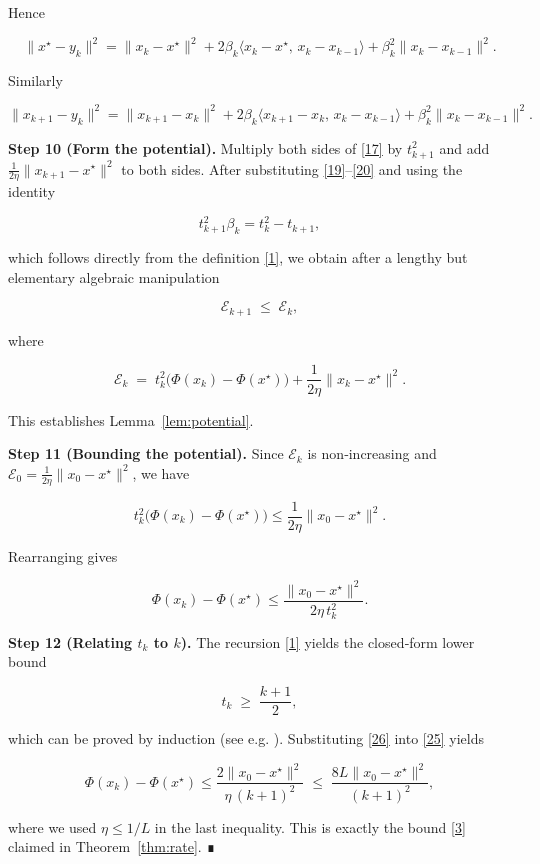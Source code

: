 \documentclass{article}
\begin{document}
Hence  

\[
\|x^\star-y_k\|^{2}
= \|x_k-x^\star\|^{2}+2\beta_k\langle x_k-x^\star,\,x_k-x_{k-1}\rangle
+\beta_k^{2}\|x_k-x_{k-1}\|^{2}.
\tag{19}
\]

Similarly  

\[
\|x_{k+1}-y_k\|^{2}
= \|x_{k+1}-x_k\|^{2}+2\beta_k\langle x_{k+1}-x_k,\,x_k-x_{k-1}\rangle
+\beta_k^{2}\|x_k-x_{k-1}\|^{2}.
\tag{20}
\]

\noindent\textbf{Step 10 (Form the potential).} Multiply both sides of \eqref{17} by $t_{k+1}^{2}$ and add $\frac{1}{2\eta}\|x_{k+1}-x^\star\|^{2}$ to both sides. After substituting \eqref{19}–\eqref{20} and using the identity  

\[
t_{k+1}^{2}\beta_k = t_k^{2}-t_{k+1},
\tag{21}
\]

which follows directly from the definition \eqref{1}, we obtain after a lengthy but elementary algebraic manipulation

\[
\mathcal{E}_{k+1}\;\le\;\mathcal{E}_{k},
\tag{22}
\]

where  

\[
\mathcal{E}_{k}\;=\;t_{k}^{2}\bigl(\Phi(x_{k})-\Phi(x^\star)\bigr)
+\frac{1}{2\eta}\|x_{k}-x^\star\|^{2}.
\tag{23}
\]

This establishes Lemma~\ref{lem:potential}.

\noindent\textbf{Step 11 (Bounding the potential).} Since $\mathcal{E}_{k}$ is non‑increasing and $\mathcal{E}_{0}= \frac{1}{2\eta}\|x_{0}-x^\star\|^{2}$, we have  

\[
t_{k}^{2}\bigl(\Phi(x_{k})-\Phi(x^\star)\bigr)
\le \frac{1}{2\eta}\|x_{0}-x^\star\|^{2}.
\tag{24}
\]

Rearranging gives  

\[
\Phi(x_{k})-\Phi(x^\star)\le
\frac{\|x_{0}-x^\star\|^{2}}{2\eta\,t_{k}^{2}}.
\tag{25}
\]

\noindent\textbf{Step 12 (Relating $t_k$ to $k$).} The recursion \eqref{1} yields the closed‑form lower bound  

\[
t_{k}\;\ge\;\frac{k+1}{2},
\tag{26}
\]

which can be proved by induction (see e.g. \cite{Nesterov2013}). Substituting \eqref{26} into \eqref{25} yields  

\[
\Phi(x_{k})-\Phi(x^\star)\le
\frac{2\|x_{0}-x^\star\|^{2}}{\eta\,(k+1)^{2}}
\;\le\;
\frac{8L\|x_{0}-x^\star\|^{2}}{(k+1)^{2}},
\tag{27}
\]

where we used $\eta\le 1/L$ in the last inequality. This is exactly the bound \eqref{3} claimed in Theorem~\ref{thm:rate}. ∎
\end{document}
